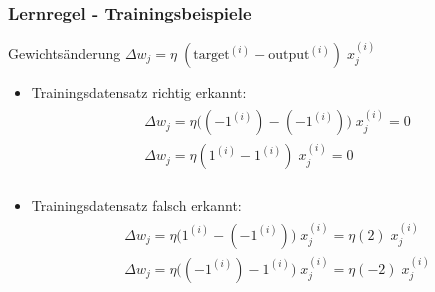 \begin{frame}
\frametitle{Lernregel - Trainingsbeispiele}

\begin{block}{Gewichtsänderung}
$\Delta w_j = \eta \; (\text{target}^{(i)} - \text{output}^{(i)})\;x^{(i)}_{j}$
\end{block}

\begin{itemize}
\item Trainingsdatensatz richtig erkannt: 
\begin{align*}
\begin{aligned}
& \Delta w_j = \eta \big( (-1^{(i)}) - (-1^{(i)}) \big)\;x^{(i)}_{j} = 0 \\
& \Delta w_j = \eta(1^{(i)} - 1^{(i)})\;x^{(i)}_{j} = 0 \\
\end{aligned}
\end{align*}

\item Trainingsdatensatz falsch erkannt:
\begin{align*}
\begin{aligned}
& \Delta w_j = \eta \big( 1^{(i)} - (-1^{(i)}) \big) \;x^{(i)}_{j} = \eta(2)\;x^{(i)}_{j} \\
& \Delta w_j = \eta \big( (-1^{(i)}) - 1^{(i)} \big) \;x^{(i)}_{j} = \eta(-2)\;x^{(i)}_{j} \\
\end{aligned}
\end{align*}

\end{itemize}



\end{frame}


